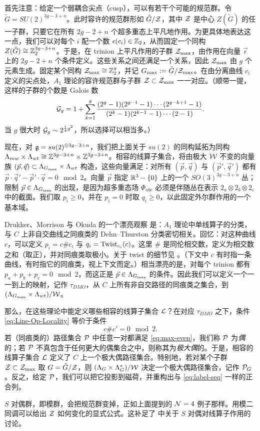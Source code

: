 首先注意：给定一个弱耦合尖点（cusp），可以有若干个可能的规范群。令 $\tilde G= SU(2)^{3g-3+n}$。此时容许的规范群形如 $\tilde G/\mathcal{Z}$，其中 $\mathcal{Z}$ 是中心 $Z(\tilde G)$ 的任一子群，只要它在所有 $2g-2+n$ 个超多重态上平凡地作用。为更具体地表达这一点，我们可以对每个 $i$ 配一个数 $\epsilon(c_i)\in \mathbb{Z}_2$，从而固定一个同构 $Z(\tilde G) \cong \mathbb{Z}_2^{3g-3+n}$。于是，在 trinion 上平凡作用的子群 $\mathcal{Z}_{\rm max}$，由作用在向量 $\vec \epsilon$ 上的 $2g-2+n$ 个条件定义。这些关系之间还满足一个关系，因此 $\mathcal{Z}_{\rm max}$ 由 $g$ 个元素生成。固定某个同构 $\mathcal{Z}_{\rm max} \cong \mathbb{Z}_2^g$，并记 $G_{\rm max}:= \tilde G/\mathcal{Z}_{\rm max}$。在由分离曲线 $c_i$ 定义的尖点处，$A_1$ 理论的容许规范群与子群 $\mathcal{Z} \subset \mathcal{Z}_{\rm max}$ 一一对应。（顺带一提，这样的子群的个数是 Galois 数
\begin{equation}
\mathcal{G}_g = 1+ \sum_{k=1}^g \frac{ (2^g-1)(2^{g-1}-1) \cdots (2^{g-k+1}-1)}{(2^k-1)(2^{k-1}-1)\cdots (2-1)}.
\end{equation}
当 $g$ 很大时 $ \mathcal{G}_g \sim 2^{\frac{1}{4}g^2 }$，所以选择可以相当多。）

现在，对 $\mathfrak{g} = su(2)^{\oplus 3g-3+n}$，我们把上面关于 $su(2)$ 的同构延拓为同构 $\Lambda_{mw} \times \Lambda_{wt} \cong \mathbb{Z}^{3g-3+n} \times \mathbb{Z}^{3g-3+n}$。相容的线算子集合，将由极大 $\mathcal{W}$ 不变的向量族 $(\vec p, \vec q) \subset \Lambda_{G_{\rm max}} \times \Lambda_{wt}$ 构造，这些向量满足：对所有 $(\vec p, \vec q)$ 与 $(\vec p', \vec q')$ 都有 $\vec p\cdot \vec q' - \vec p' \cdot \vec q = 0 \mod 2$。向量 $\vec p$ 指定 $\mathbb{R}^3-\{ 0 \} $ 上的一个 $SO(3)^{3g-3+n}$ 丛；限制 $\vec p \in \Lambda_{G_{\rm max}}$ 的出现，是因为超多重态场 $\Phi_{abc}$ 必须是伴随丛在表示 $2_a \otimes 2_b \otimes 2_c$ 中的截面。我们取 $p_i \geq 0$，并在 $p_i=0$ 时取 $q_i \geq 0$，以此固定外尔群作用的一个基本域。

Drukker、Morrison 与 Okuda 的一个漂亮观察 \cite{Drukker:2009tz} 是：$A_1$ 理论中单线算子的分类，与 $C$ 上非自交曲线之同痕类的 Dehn–Thurston 分类密切相关。回忆：对这种曲线 $c$，可以定义 $p_i = c \# c_i$ 与 $q_i = {\rm Twist}_{c_i}(c)$。这里 $\# $ 是同伦相交数，定义为相交数之和（取正），并对同痕类取极小。关于 twist 的细节见 \cite{Drukker:2009tz}。（下文中 $c$ 有时指一条曲线，有时指它的同痕类，视上下文而定。）相当漂亮的是，对每个 trinion 都有 $p_a + p_b + p_c = 0 \mod 2$，而这正是 $\vec p \in \Lambda_{G_{\rm max}}$ 的条件。因此我们可以定义一个一一到上的映射，记作 $\tau_{DMO}$，从 $C$ 上所有非自交路径的同痕类之集合，到 $(\Lambda_{G_{\rm max}} \times \Lambda_{wt})/\mathcal{W}$。

那么，在这些理论中能定义哪些相容的线算子集合 $\mathcal{L}$？在对应 $\tau_{DMO}$ 之下，条件 \eqref{eq:Line-Op-Locality} 等价于条件
\begin{equation}\label{eq:max-even}
c \# c' = 0 \mod 2.
\end{equation}
若（同痕类的）路径集合 $\mathcal{P}$ 中任意一对都满足 \eqref{eq:max-even}，我们称 $\mathcal{P}$ 为\emph{偶}的；若 $\mathcal{P}$ 不真包含于任何更大的偶集合之中，则称其为\emph{极大偶}的。于是，相容的线算子集合 $\mathcal{L}$ 定义了 $C$ 上一个极大偶路径集合。特别地，若对某个子群 $\mathcal{Z} \subset \mathcal{Z}_{\rm max}$ 取 $G = \tilde G/\mathcal{Z}$，则 $(\Lambda_G \times\Lambda_G^*)/\mathcal{W}$ 决定一个极大偶路径集合，记作 $\mathcal{P}_G$。反之，给定 $\mathcal{P}$，我们可以把它投影到磁荷，并重构出与 \eqref{eq:label-seq} 一样的正合列。

$S$ 对偶群，即模群，会把规范群变掉，正如上面提到的 $\mathcal{N}=4$ 例子那样。用模二同调可以给出 $\mathcal{Z}$ 如何变化的显式公式。这补足了 \cite{Drukker:2009tz} 中关于 $S$ 对偶对线算子作用的讨论。
